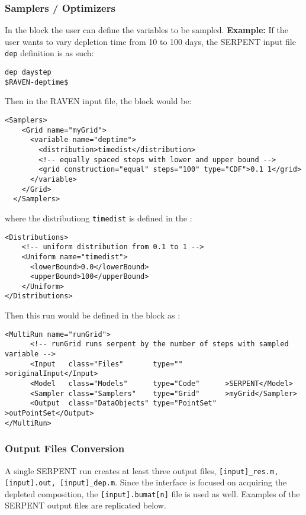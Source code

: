 \subsubsection{Samplers / Optimizers}
In the  block the user can define the variables
to be sampled.
\textbf{Example:} If the user wants to vary depletion time from
10 to 100 days, the SERPENT input file \texttt{dep} definition is as such:
\begin{lstlisting}
dep daystep 
$RAVEN-deptime$ 
\end{lstlisting}

Then in the RAVEN input file, the  block would be:
\begin{lstlisting}[style=XML]
  <Samplers>
    <Grid name="myGrid">
      <variable name="deptime">
        <distribution>timedist</distribution>
        <!-- equally spaced steps with lower and upper bound -->
        <grid construction="equal" steps="100" type="CDF">0.1 1</grid>
      </variable>
    </Grid>
  </Samplers>
\end{lstlisting}
where the distributiong \texttt{timedist} is defined in the :
\begin{lstlisting}[style=XML]
  <Distributions>
    <!-- uniform distribution from 0.1 to 1 -->
    <Uniform name="timedist">
      <lowerBound>0.0</lowerBound>
      <upperBound>100</upperBound>
    </Uniform>
</Distributions>
\end{lstlisting}

Then this run would be defined in the  block as :
\begin{lstlisting}[style=XML]
<MultiRun name="runGrid">
      <!-- runGrid runs serpent by the number of steps with sampled variable -->
      <Input   class="Files"       type=""          >originalInput</Input>
      <Model   class="Models"      type="Code"      >SERPENT</Model>
      <Sampler class="Samplers"    type="Grid"      >myGrid</Sampler>
      <Output  class="DataObjects" type="PointSet"  >outPointSet</Output>
</MultiRun>
\end{lstlisting}

\subsubsection{Output Files Conversion}
A single SERPENT run creates at least three output files,
\texttt{[input]\_res.m, [input].out, [input]\_dep.m}.
Since the interface is
focused on acquiring the depleted composition, the \texttt{[input].bumat[n]}
file is used as well. Examples of the SERPENT output files are replicated below.

